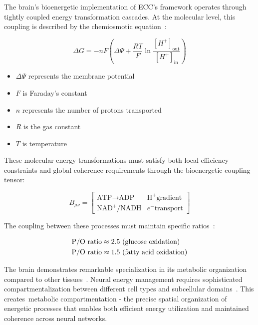The brain's bioenergetic implementation of ECC's framework operates through tightly coupled energy transformation cascades. At the molecular level, this coupling is described by the chemiosmotic equation~\cite{Nicholls2013}:

\begin{equation}
    \Delta G = -nF(\Delta \Psi + \frac{RT}{F}\ln\frac{[H^+]_{\text{out}}}{[H^+]_{\text{in}}})
\end{equation}

\begin{itemize}
    \item $\Delta \Psi$ represents the membrane potential
    \item $F$ is Faraday's constant
    \item $n$ represents the number of protons transported
    \item $R$ is the gas constant
    \item $T$ is temperature
\end{itemize}

These molecular energy transformations must satisfy both local efficiency constraints and global coherence requirements through the bioenergetic coupling tensor:

\begin{equation}
    B_{\mu\nu} = \begin{bmatrix}
        \text{ATP}\rightarrow\text{ADP} & \text{H}^+\text{gradient} \\
        \text{NAD}^+\text{/NADH}        & e^-\text{transport}
    \end{bmatrix}
\end{equation}

The coupling between these processes must maintain specific ratios~\cite{Rolfe1997, Berndt2012}:

\begin{align}
    \text{\index{P/O ratio}P/O ratio} & \approx 2.5 \text{ (glucose oxidation)}    \\
    \text{P/O ratio}                  & \approx 1.5 \text{ (fatty acid oxidation)}
\end{align}

The brain demonstrates remarkable specialization in its metabolic organization compared to other tissues~\cite{Berndt2012, bullmore2012economy}. Neural energy management requires sophisticated compartmentalization between different cell types and subcellular domains~\cite{Shulman2004}. This creates~metabolic compartmentation - the precise spatial organization of energetic processes that enables both efficient energy utilization and maintained coherence across neural networks.

